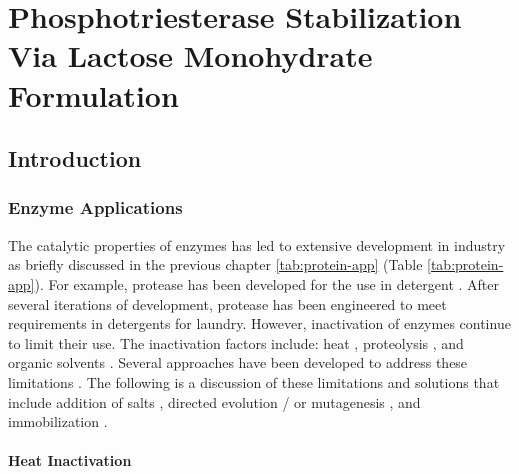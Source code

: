 \chapter{Phosphotriesterase Stabilization Via Lactose Monohydrate Formulation}
\label{chap:lactose}

\begin{refsection}

\section{Introduction}

\subsection{Enzyme Applications}

The catalytic properties of enzymes has led to extensive development in industry
as briefly discussed in the previous chapter \ref{tab:protein-app} (Table
\ref{tab:protein-app}). For example, protease has been developed for the use in
detergent \cite{Kirk2002}. After several iterations of development, protease
has been engineered to meet requirements in detergents for laundry.  However,
inactivation of enzymes continue to limit their use. The inactivation factors
include: heat \cite{Shirley1995,Perdana2012,Etzel1996,Gouda2003}, proteolysis
\cite{VandenBurg2002a,Ahmad2012}, and organic solvents
\cite{LeJeune1997a,Izutsu2009,Stepankova2013}. Several approaches have been
developed to address these limitations
\cite{Caldwell1991,LeJeune1997a,You1996,Gouda2003,Ahmad2012}. The following is
a discussion of these limitations and solutions that include addition of salts
\cite{Appleton1997,Gouda2003}, directed evolution / or mutagenesis
\cite{Kamerzell2008,Xiong2007,Ahmad2012,You1996,Tsai2012b}, and immobilization
\cite{Stepankova2013,Dravis2001,LeJeune1997a,Barbosa2014}.

\subsubsection{Heat Inactivation}


\end{refsection}
